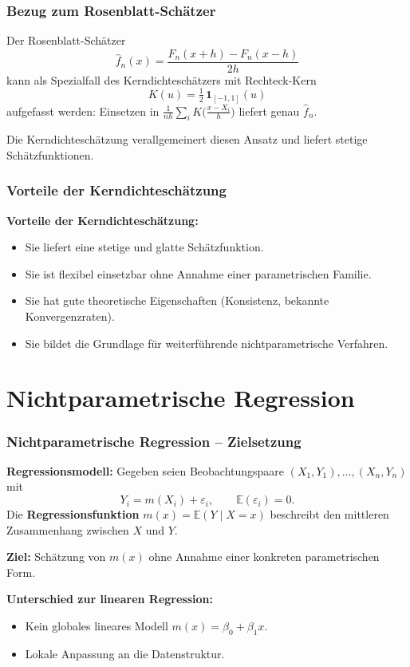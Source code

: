 \documentclass{beamer}
\begin{document}
	
	\begin{frame}
		\frametitle{Bezug zum Rosenblatt-Schätzer}
		
		Der Rosenblatt-Schätzer
		\[
		\hat{f}_n(x) = \frac{F_n(x+h) - F_n(x-h)}{2h}
		\]
		kann als Spezialfall des Kerndichteschätzers mit Rechteck-Kern
		\[
		K(u) = \tfrac{1}{2}\,\mathbf{1}_{[-1,1]}(u)
		\]
		aufgefasst werden: Einsetzen in $\frac{1}{nh}\sum_i K\!\bigl(\frac{x-X_i}{h}\bigr)$ liefert genau $\hat{f}_n$.
		
		\vspace{0.5em}
		
		Die Kerndichteschätzung verallgemeinert diesen Ansatz und liefert stetige Schätzfunktionen.
	\end{frame}
	
	
	\begin{frame}
		\frametitle{Vorteile der Kerndichteschätzung}
		
		\textbf{Vorteile der Kerndichteschätzung:}
		\begin{itemize}
			\itemsep10pt
			\item Sie liefert eine stetige und glatte Schätzfunktion.
			\item Sie ist flexibel einsetzbar ohne Annahme einer parametrischen Familie.
			\item Sie hat gute theoretische Eigenschaften (Konsistenz, bekannte Konvergenzraten).
			\item Sie bildet die Grundlage für weiterführende nichtparametrische Verfahren.
		\end{itemize}
	\end{frame}
	
	
	\section{Nichtparametrische Regression}
	
	
	\begin{frame}
		\frametitle{Nichtparametrische Regression – Zielsetzung}
		
		\textbf{Regressionsmodell:} Gegeben seien Beobachtungspaare $(X_1, Y_1), \ldots, (X_n, Y_n)$ mit
		\[
		Y_i = m(X_i) + \varepsilon_i, \qquad \mathbb{E}(\varepsilon_i) = 0.
		\]
		Die \textbf{Regressionsfunktion} $m(x) = \mathbb{E}(Y \mid X = x)$ beschreibt den mittleren Zusammenhang zwischen $X$ und $Y$.
		
		\vspace{0.5em}
		
		\textbf{Ziel:} Schätzung von $m(x)$ ohne Annahme einer konkreten parametrischen Form.
		
		\vspace{0.5em}
		
		\textbf{Unterschied zur linearen Regression:}
		\begin{itemize}
			\itemsep6pt
			\item Kein globales lineares Modell $m(x) = \beta_0 + \beta_1 x$.
			\item Lokale Anpassung an die Datenstruktur.
		\end{itemize}
	\end{frame}
	
\end{document}
